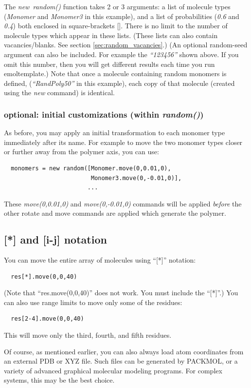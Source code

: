\documentclass[11pt]{article}
\begin{document}
The \mbox{\textit{new random()}} function takes 2 or 3 arguments:
a list of molecule types 
(\mbox{\textit{Monomer}} and \mbox{\textit{Monomer3}} in this example),
and a list of probabilities (\textit{0.6} and \textit{0.4})
both enclosed in square-brackets [].
There is no limit to the number of molecule types which appear in these lists.
(These lists can also contain vacancies/blanks.
 See section \ref{sec:random_vacancies}.)
(An optional random-seed argument can also be included.
 For example the \mbox{\textit{``123456''}} shown above.
 If you omit this number, then you will get different 
 results each time you run emoltemplate.)
Note that once a molecule containing random monomers is defined, 
(\mbox{\textit{``RandPoly50''}} in this example), each copy of that molecule 
(created using the \textit{new} command) is identical.
\subsubsection*{optional: initial customizations (within \textit{random()})}
As before, you may apply an initial transformation to each monomer type
immediately after its name. 
For example to move the two monomer types 
closer or further away from the polymer axis, you can use:
\begin{verbatim}
  monomers = new random([Monomer.move(0,0.01,0),
                         Monomer3.move(0,-0.01,0)], 
                        ...
\end{verbatim}
These \mbox{\textit{move(0,0.01,0)}} and \mbox{\textit{move(0,-0.01,0)}}
commands will be applied \textit{before} 
the other rotate and move commands are applied
which generate the polymer.

\subsection{[*] and [i-j] notation}
\label{sec:array_wildcards_intro}
You can move the entire array of molecules using ``[*]'' notation:
\begin{verbatim}
  res[*].move(0,0,40)
\end{verbatim}
(Note that ``res.move(0,0,40)'' does not work.
 You must include the ``[*]''.)
You can also use range limits to move only some of the residues:
\begin{verbatim}
  res[2-4].move(0,0,40)
\end{verbatim}
This will move only the third, fourth, and fifth residues.

Of course, as mentioned earlier, you can also always load atom 
coordinates from an external PDB or XYZ file.
Such files can be generated by PACKMOL, 
or a variety of advanced graphical molecular modeling programs. 
For complex systems, this may be the best choice.
\end{document}
